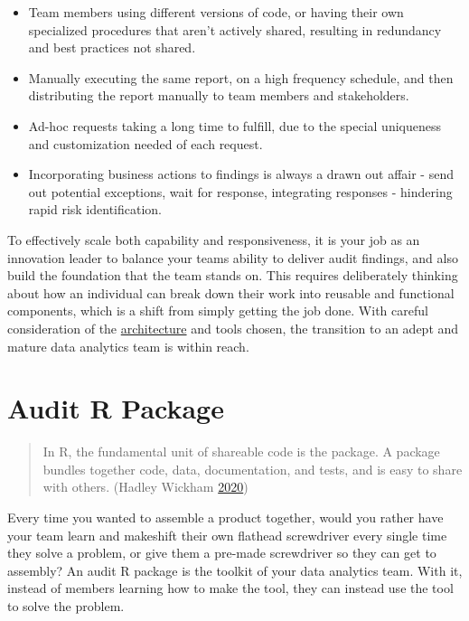 \documentclass[
]{book}
\providecommand{\tightlist}{%
  \setlength{\itemsep}{0pt}\setlength{\parskip}{0pt}}
\begin{document}
\begin{itemize}
\tightlist
\item
  Team members using different versions of code, or having their own specialized procedures that aren't actively shared, resulting in redundancy and best practices not shared.
\item
  Manually executing the same report, on a high frequency schedule, and then distributing the report manually to team members and stakeholders.
\item
  Ad-hoc requests taking a long time to fulfill, due to the special uniqueness and customization needed of each request.
\item
  Incorporating business actions to findings is always a drawn out affair - send out potential exceptions, wait for response, integrating responses - hindering rapid risk identification.
\end{itemize}

To effectively scale both capability and responsiveness, it is your job as an innovation leader to balance your teams ability to deliver audit findings, and also build the foundation that the team stands on. This requires deliberately thinking about how an individual can break down their work into reusable and functional components, which is a shift from simply getting the job done. With careful consideration of the \protect\hyperlink{architecture}{architecture} and tools chosen, the transition to an adept and mature data analytics team is within reach.

\hypertarget{auditpackage}{%
\chapter{Audit R Package}\label{auditpackage}}

\begin{quote}
In R, the fundamental unit of shareable code is the package. A package bundles together code, data, documentation, and tests, and is easy to share with others. (Hadley Wickham \protect\hyperlink{ref-r-pkgs}{2020})
\end{quote}

Every time you wanted to assemble a product together, would you rather have your team learn and makeshift their own flathead screwdriver every single time they solve a problem, or give them a pre-made screwdriver so they can get to assembly? An audit R package is the toolkit of your data analytics team. With it, instead of members learning how to make the tool, they can instead use the tool to solve the problem.
\end{document}
